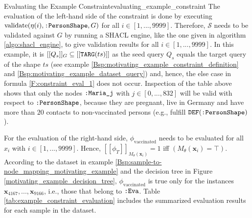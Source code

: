 \begin{Bsp}{Evaluating the Example Constraint}{evaluating_example_constraint}
The evaluation of the left-hand side of the constraint is done by executing $\text{validate}(\eta(i),\texttt{:PersonShape},G)$ for all $i \in [1,...,9999]$.
Therefore, $\mathcal{S}$ needs to be validated against $G$ by running a SHACL engine, like the one given in algorithm \ref{algo:shacl_engine}, to give validation results for all $i \in [1,...,9999]$. In this example, it is $[[Q_s]]_G \subseteq [[\texttt{TARG}(ts)]]$ as the seed query $Q_s$ equals the target query of the shape $ts$ (see example \ref{Bsp:motivating_example_constraint_definition} and \ref{Bsp:motivating_example_dataset_query}) and, hence, the else case in formula \ref{F:constraint_eval_1} does not occur. Inspection of the table above shows that only the nodes $\texttt{:Maria\_j}$ with $j \in [0,...,832]$ will be valid with respect to $\texttt{:PersonShape}$, because they are pregnant, live in Germany and have more than $20$ contacts to non-vaccinated persons (e.g., fulfill $\texttt{DEF}(\texttt{:PersonShape})$).

For the evaluation of the right-hand side, $\phi_{\text{vaccinated}}$ needs to be evaluated for all $x_i$ with $i \in [1,...,9999]$. Hence, $[[\phi_{T}]]_{M_\theta(\mathbf{x}_i)} = 1$ iff $(M_\theta(\mathbf{x}_i) = \top)$. According to the dataset in example \ref{Bsp:sample-to-node_mapping_motivating_example} and the decision tree in Figure \ref{motivating_example_decision_tree}, $\phi_{\text{vaccinated}}$ is true only for the instances $\mathbf{x}_{4167},...,\mathbf{x}_{9166}$, i.e., those that belong to $\texttt{:Eva}$. Table \ref{tab:example_constraint_evaluation} includes the summarized evaluation results for each sample in the dataset. 


\end{Bsp}
